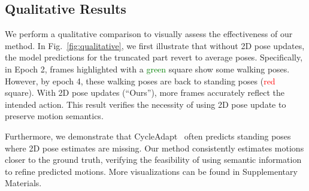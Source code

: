 \subsection{Qualitative Results}
We perform a qualitative comparison to visually assess the effectiveness of our method. 
In Fig.~\ref{fig:qualitative}, 
we first illustrate that without 2D pose updates, the model predictions for the truncated part revert to average poses. Specifically, in Epoch 2, frames highlighted with a \textcolor{green}{green} square show some walking poses. However, by epoch 4, these walking poses are back to standing poses (\textcolor{red}{red} square). With 2D pose updates (``Ours''),  
more frames accurately reflect the intended action. 
This result verifies the necessity of using 2D pose update to preserve motion semantics.

Furthermore, we demonstrate that CycleAdapt~\cite{cycleadapt} often predicts standing poses where 2D pose estimates are missing.  Our method consistently estimates motions closer to the ground truth, verifying the feasibility of using semantic information to refine predicted motions. 
More visualizations can be found in Supplementary Materials.